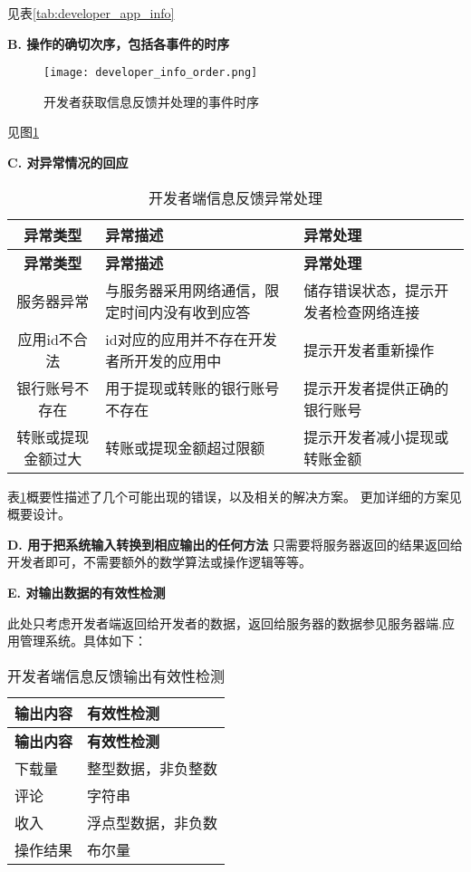 见表\ref{tab:developer_app_info}

\textbf{B. 操作的确切次序，包括各事件的时序}

\begin{figure}[ht]
	\centering
	\texttt{[image: developer\_info\_order.png]}
	\caption{开发者获取信息反馈并处理的事件时序} \label{fig:developer_info_order}
\end{figure}
见图\ref{fig:developer_info_order}

\textbf{C. 对异常情况的回应}

\begin{longtable}{|c|p{6cm}|p{6cm}|}
\caption{开发者端信息反馈异常处理}\label{tab:developer_info_exception}\\
\hline
\textbf{异常类型} & \textbf{异常描述} & \textbf{异常处理}\\
\hline
\endfirsthead

\hline
\textbf{异常类型} & \textbf{异常描述} & \textbf{异常处理}\\
\hline
\endhead
\hline 
\endfoot
\hline
\endlastfoot
服务器异常 & 
与服务器采用网络通信，限定时间内没有收到应答 &
储存错误状态，提示开发者检查网络连接\\
应用id不合法 
& id对应的应用并不存在开发者所开发的应用中
& 提示开发者重新操作\\
银行账号不存在
& 用于提现或转账的银行账号不存在
&提示开发者提供正确的银行账号\\
转账或提现金额过大
& 转账或提现金额超过限额
& 提示开发者减小提现或转账金额
\end{longtable}

表\ref{tab:developer_info_exception}概要性描述了几个可能出现的错误，以及相关的解决方案。
更加详细的方案见概要设计。

\textbf{D. 用于把系统输入转换到相应输出的任何方法}
只需要将服务器返回的结果返回给开发者即可，不需要额外的数学算法或操作逻辑等等。
		
\textbf{E. 对输出数据的有效性检测}

此处只考虑开发者端返回给开发者的数据，返回给服务器的数据参见服务器端.应用管理系统。具体如下：
\begin{longtable}{|p{7cm}|p{7cm}|}
\caption{开发者端信息反馈输出有效性检测}\label{tab:concrete_dev_sys_output_valid} \\
\hline
\textbf{输出内容} & \textbf{有效性检测} \\
\hline
\endfirsthead
\hline
\textbf{输出内容} & \textbf{有效性检测} \\
\hline
\endhead
\hline 
\endfoot
\hline
\endlastfoot

下载量 & 整型数据，非负整数 \\
评论 & 字符串\\
收入 & 浮点型数据，非负数\\
操作结果 & 布尔量

\end{longtable}


